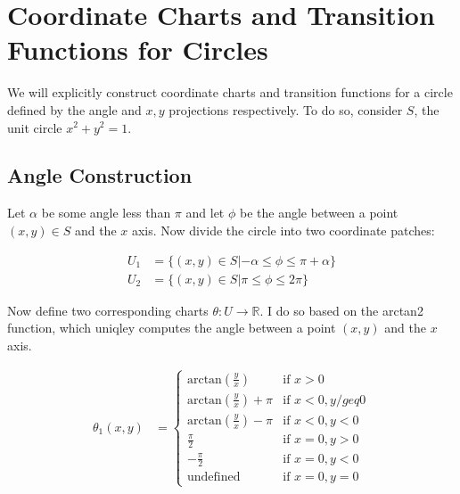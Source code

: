 \documentclass{article}
\begin{document}
\section{Coordinate Charts and Transition Functions for Circles}

    We will explicitly construct coordinate charts and transition functions for a circle defined by the angle and $x,y$ projections respectively. To do so, consider $S$, the unit circle $x^2 + y^2 = 1$.

    \subsection{Angle Construction}

        Let $\alpha$ be some angle less than $\pi$ and let $\phi$ be the angle between a point $(x,y) \in S$ and the $x$ axis. Now divide the circle into two coordinate patches:

        \begin{align*}
            U_1 &= \{(x,y) \in S | - \alpha \leq \phi \leq \pi + \alpha \} \\
            U_2 &= \{(x,y) \in S | \pi \leq \phi \leq 2\pi \}
        \end{align*}

        Now define two corresponding charts $\theta: U \rightarrow \mathbb{R}$. I do so based on the arctan2 function, which uniqley computes the angle between a point $(x,y)$ and the $x$ axis. 

        \begin{align*}
            \theta_1(x,y) &= 
            \begin{cases}
                \textrm{arctan}(\frac{y}{x}) & \textrm{if } x > 0 \\
                \textrm{arctan}(\frac{y}{x}) + \pi & \textrm{if } x < 0, y /geq 0 \\
                \textrm{arctan}(\frac{y}{x}) - \pi & \textrm{if } x < 0, y < 0 \\
                \frac{\pi}{2} & \textrm{if } x = 0, y > 0 \\
                -\frac{\pi}{2} & \textrm{if } x = 0, y < 0 \\
                \textrm{undefined} & \textrm{if } x = 0, y = 0
            \end{cases}
        \end{align*}
\end{document}
